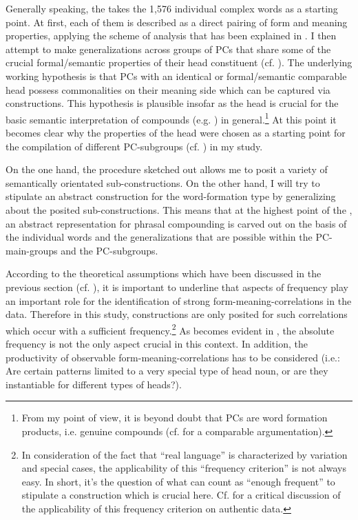 \documentclass[output=paper]{LSP/langsci}
\begin{document}
Generally speaking, the  takes the 1,576 individual complex words as a starting point. At first, each of them is described as a direct pairing of form and meaning properties, applying the scheme of analysis that has been explained in . I then attempt to make generalizations across groups of PCs that share some of the crucial formal\slash semantic properties of their head constituent (cf. ). The underlying wor\-king hypothesis is that PCs with an identical or formal\slash semantic comparable head possess commonalities on their meaning side which can be captured via constructions. This hypothesis is plausible insofar as the head is crucial for the basic semantic interpretation of  compounds (e.g. \citealt[38]{Fandrych1994}) in general.\footnote{From my point of view, it is beyond doubt that PCs are word formation products, i.e. genuine compounds (cf. \citealt[12]{Schlücker2012} for a comparable argumentation).} At this point it becomes clear why the properties of the head were chosen as a starting point for the compilation of different PC-subgroups (cf. ) in my study. 

On the one hand, the procedure sketched out allows me to posit a variety of semantically orientated sub-constructions. On the other hand, I will try to stipulate an abstract construction for the word-formation type by generalizing about the posited sub-constructions. This means that at the highest point of the , an abstract representation for phrasal compounding is carved out on the basis of the individual words and the generalizations that are possible within the PC-main-groups and the PC-subgroups. 



According to the theoretical assumptions which have been discussed in the previous section (cf. ), it is important to underline that aspects of frequency play an important role for the identification of strong form-meaning-correlations in the data.  Therefore in this study, constructions are only posited for such correlations which occur with a sufficient frequency.\footnote{In consideration of the fact that ``real language'' is characterized by variation and special cases, the applicability of this ``frequency criterion'' is not always easy. In short, it’s the question of what can count as ``enough frequent'' to stipulate a construction which is crucial here. Cf. \citet{Hein2015} for a critical discussion of the applicability of this frequency criterion on authentic data.} As becomes evident in , the absolute frequency is not the only aspect crucial in this context. In addition, the productivity of observable form-meaning-correlations has to be considered (i.e.: Are certain patterns limited to a very special type of head noun, or are they instantiable for different types of heads?).  
\end{document}
